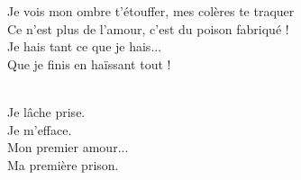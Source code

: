 \begin{lyrics}
\\

\\
Je vois mon ombre t'étouffer, mes colères te traquer\\
Ce n'est plus de l'amour, c'est du poison fabriqué !\\
Je hais tant ce que je hais...\\
Que je finis en haïssant tout !

\\
Je lâche prise.\\
Je m'efface.\\
Mon premier amour...\\
Ma première prison.\\
\end{lyrics}

